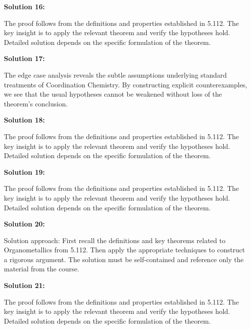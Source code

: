 \documentclass[12pt,a4paper]{exam}
\begin{document}
\textbf{Solution 16:}

The proof follows from the definitions and properties established in 5.112. The key insight is to apply the relevant theorem and verify the hypotheses hold. Detailed solution depends on the specific formulation of the theorem.

\vspace{0.5cm}

\textbf{Solution 17:}

The edge case analysis reveals the subtle assumptions underlying standard treatments of Coordination Chemistry. By constructing explicit counterexamples, we see that the usual hypotheses cannot be weakened without loss of the theorem's conclusion.

\vspace{0.5cm}

\textbf{Solution 18:}

The proof follows from the definitions and properties established in 5.112. The key insight is to apply the relevant theorem and verify the hypotheses hold. Detailed solution depends on the specific formulation of the theorem.

\vspace{0.5cm}

\textbf{Solution 19:}

The proof follows from the definitions and properties established in 5.112. The key insight is to apply the relevant theorem and verify the hypotheses hold. Detailed solution depends on the specific formulation of the theorem.

\vspace{0.5cm}

\textbf{Solution 20:}

Solution approach: First recall the definitions and key theorems related to Organometallics from 5.112. Then apply the appropriate techniques to construct a rigorous argument. The solution must be self-contained and reference only the material from the course.

\vspace{0.5cm}

\textbf{Solution 21:}

The proof follows from the definitions and properties established in 5.112. The key insight is to apply the relevant theorem and verify the hypotheses hold. Detailed solution depends on the specific formulation of the theorem.

\vspace{0.5cm}
\end{document}
